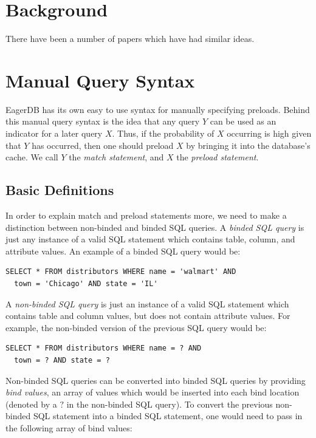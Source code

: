 \documentclass[12pt]{article}
\begin{document}
\section{Background}

There have been a number of papers which have had similar ideas.


\section{Manual Query Syntax}

EagerDB has its own easy to use syntax for manually specifying preloads. Behind this manual query syntax is the idea that any query $Y$ can be used as an indicator for a later query $X$. Thus, if the probability of $X$ occurring is high given that $Y$ has occurred, then one should preload $X$ by bringing it into the database's cache. We call $Y$ the \emph{match statement}, and $X$ the \emph{preload statement}.

\subsection{Basic Definitions}

In order to explain match and preload statements more, we need to make a distinction between non-binded and binded SQL queries. A \emph{binded SQL query} is just any instance of a valid SQL statement which contains table, column, and attribute values. An example of a binded SQL query would be:

\begin{lstlisting}
SELECT * FROM distributors WHERE name = 'walmart' AND
  town = 'Chicago' AND state = 'IL'
\end{lstlisting}

A \emph{non-binded SQL query} is just an instance of a valid SQL statement which contains table and column values, but does not contain attribute values. For example, the non-binded version of the previous SQL query would be:

\begin{lstlisting}
SELECT * FROM distributors WHERE name = ? AND
  town = ? AND state = ?
\end{lstlisting}

Non-binded SQL queries can be converted into binded SQL queries by providing \emph{bind values}, an array of values which would be inserted into each bind location (denoted by a $?$ in the non-binded SQL query). To convert the previous non-binded SQL statement into a binded SQL statement, one would need to pass in the following array of bind values:
\end{document}
